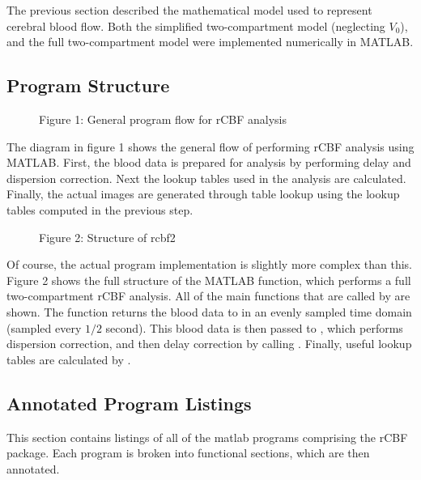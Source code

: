 The previous section described the mathematical model used to
represent cerebral blood flow.  Both the simplified two-compartment
model (neglecting $V_0$), and the full two-compartment model were
implemented numerically in MATLAB.

\subsection{Program Structure}

\begin{figure}
\centerline{
}
\vspace{.25in}
\centerline{Figure 1: General program flow for rCBF analysis}
\end{figure}

The diagram in figure 1 shows the general flow of performing rCBF
analysis using MATLAB.  First, the blood data is prepared for
analysis by performing delay and dispersion correction.  Next the
lookup tables used in the analysis are calculated.  Finally, the
actual images are generated through table lookup using the lookup
tables computed in the previous step.

\begin{figure}
\centerline{
}
\vspace{.25in}
\centerline{Figure 2: Structure of rcbf2}
\end{figure}

Of course, the actual program implementation is slightly more complex
than this.  Figure 2 shows the full structure of the 
MATLAB function, which performs a full two-compartment rCBF analysis.
All of the main functions that are called by  are shown.
The  function returns the blood data to
 in an evenly sampled time domain (sampled every $1/2$
second).  This blood data is then passed to ,
which performs dispersion correction, and then delay correction by
calling .  Finally, useful lookup tables are
calculated by .

\subsection{Annotated Program Listings}

This section contains listings of all of the matlab programs
comprising the rCBF package.  Each program is broken into functional
sections, which are then annotated.


